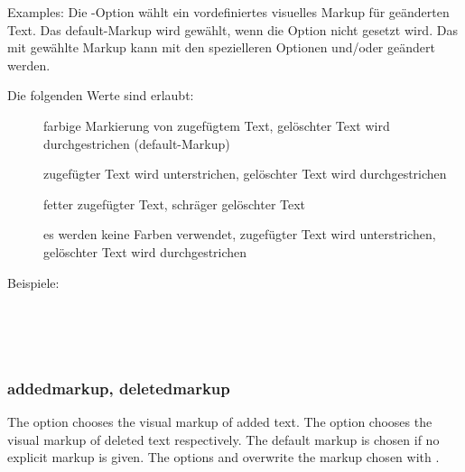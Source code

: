 Examples:
\fi
\ifGERMAN
	Die -Option wählt ein vordefiniertes visuelles Markup für geänderten Text.
	Das default-Markup wird gewählt, wenn die Option nicht gesetzt wird.
	Das mit  gewählte Markup kann mit den spezielleren Optionen  und/oder  geändert werden.

	Die folgenden Werte sind erlaubt:
	\begin{description}
		\item [] farbige Markierung von zugefügtem Text, gelöschter Text wird durchgestrichen (default-Markup)
		\item [] zugefügter Text wird unterstrichen, gelöschter Text wird durchgestrichen
		\item [] fetter zugefügter Text, schräger gelöschter Text
		\item [] es werden keine Farben verwendet, zugefügter Text wird unterstrichen, gelöschter Text wird durchgestrichen
	\end{description}

	Beispiele:
\fi

\\
\\
\\

\subsubsection{addedmarkup, deletedmarkup}
\ifENGLISH
The  option chooses the visual markup of added text.
The  option chooses the visual markup of deleted text respectively.
The default markup is chosen if no explicit markup is given.
The options  and  overwrite the markup chosen with .

